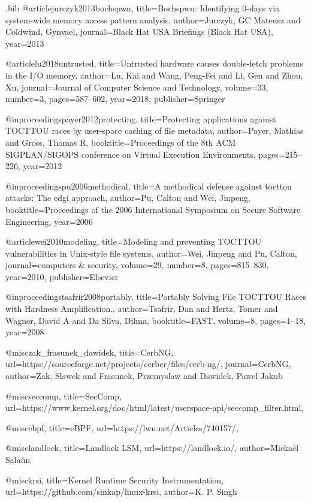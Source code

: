 \begin{filecontents}{\jobname.bib}
@article{jurczyk2013bochspwn,
  title={Bochspwn: Identifying 0-days via system-wide memory access pattern analysis},
  author={Jurczyk, GC Mateusz and Coldwind, Gynvael},
  journal={Black Hat USA Briefings (Black Hat USA)},
  year={2013}
}


@article{lu2018untrusted,
  title={Untrusted hardware causes double-fetch problems in the I/O memory},
  author={Lu, Kai and Wang, Peng-Fei and Li, Gen and Zhou, Xu},
  journal={Journal of Computer Science and Technology},
  volume={33},
  number={3},
  pages={587--602},
  year={2018},
  publisher={Springer}
}

@inproceedings{payer2012protecting,
  title={Protecting applications against TOCTTOU races by user-space caching of file metadata},
  author={Payer, Mathias and Gross, Thomas R},
  booktitle={Proceedings of the 8th ACM SIGPLAN/SIGOPS conference on Virtual Execution Environments},
  pages={215--226},
  year={2012}
}

@inproceedings{pu2006methodical,
  title={A methodical defense against tocttou attacks: The edgi approach},
  author={Pu, Calton and Wei, Jinpeng},
  booktitle={Proceedings of the 2006 International Symposium on Secure Software Engineering},
  year={2006}
}

@article{wei2010modeling,
  title={Modeling and preventing TOCTTOU vulnerabilities in Unix-style file systems},
  author={Wei, Jinpeng and Pu, Calton},
  journal={computers \& security},
  volume={29},
  number={8},
  pages={815--830},
  year={2010},
  publisher={Elsevier}
}

@inproceedings{tsafrir2008portably,
  title={Portably Solving File TOCTTOU Races with Hardness Amplification.},
  author={Tsafrir, Dan and Hertz, Tomer and Wagner, David A and Da Silva, Dilma},
  booktitle={FAST},
  volume={8},
  pages={1--18},
  year={2008}
}

@misc{zak_frasunek_dawidek,
  title={CerbNG},
  url={https://sourceforge.net/projects/cerber/files/cerb-ng/}, 
  journal={CerbNG}, 
  author={Zak, Slawek and Frasunek, Przemyslaw and Dawidek, Pawel Jakub}
} 

@misc{seccomp,
  title={SecComp},
  url={https://www.kernel.org/doc/html/latest/userspace-api/seccomp_filter.html}, 
} 

@misc{ebpf,
  title={eBPF},
  url={https://lwn.net/Articles/740157/}, 
}

@misc{landlock,
  title={Landlock LSM},
  url={https://landlock.io/},
  author={Mickaël Salaün}
}

@misc{krsi,
  title={Kernel Runtime Security Instrumentation},
  url={https://github.com/sinkap/linux-krsi},
  author={K. P. Singh}
}


\end{filecontents}
